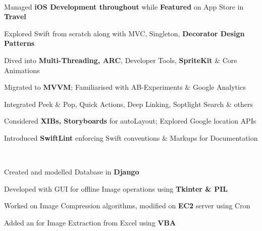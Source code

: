 \documentclass[]{Kauts}
\begin{document}
\begin{minipage}[t]{0.69\textwidth}
\\
\begin{tightemize}
\item Managed \textbf{iOS Development throughout} while \textbf{Featured} on App Store in \textbf{Travel}\\
\item Explored Swift from scratch along with MVC, Singleton, \textbf{Decorator Design Patterns}\\
\item Dived into \textbf{Multi-Threading, ARC}, Developer Tools, \textbf{SpriteKit} \& Core Animations\\
\item Migrated to \textbf{MVVM}; Familiarised with AB-Experiments \& Google Analytics\\
\item Integrated Peek \& Pop, Quick Actions, Deep Linking, Soptlight Search \& others\\
\item Considered \textbf{XIBs, Storyboards} for autoLayout; Explored Google location APIs\\
\item Introduced \textbf{SwiftLint} enforcing Swift conventions \& Markups for Documentation\\
\end{tightemize}
\sectionsep

\\
\begin{tightemize}
\item Created  and modelled Database in \textbf{Django}\\
\item Developed  with GUI for offline Image operations using \textbf{Tkinter \& PIL}\\
\item Worked on Image Compression algorithms, modified on \textbf{EC2} server using Cron\\
\item Added an  for Image Extraction from Excel using \textbf{VBA}
\end{tightemize}


\end{minipage}
\end{document}
